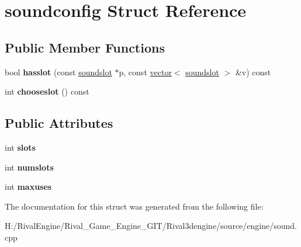 \hypertarget{structsoundconfig}{}\section{soundconfig Struct Reference}
\label{structsoundconfig}
\subsection*{Public Member Functions}
\begin{DoxyCompactItemize}
\item 
\mbox{\label{structsoundconfig_aeb69ffff91904dc36452a62a4b24dab7}} 
bool {\bfseries hasslot} (const \hyperlink{structsoundslot}{soundslot} $\ast$p, const \hyperlink{structvector}{vector}$<$ \hyperlink{structsoundslot}{soundslot} $>$ \&v) const
\item 
\mbox{\label{structsoundconfig_ae851aaf065b2e70436b993bb0e7738d6}} 
int {\bfseries chooseslot} () const
\end{DoxyCompactItemize}
\subsection*{Public Attributes}
\begin{DoxyCompactItemize}
\item 
\mbox{\label{structsoundconfig_a92f135ce709409bc4ca195ed58c67eab}} 
int {\bfseries slots}
\item 
\mbox{\label{structsoundconfig_a38da64a5934dce72b1141146c7f8fa94}} 
int {\bfseries numslots}
\item 
\mbox{\label{structsoundconfig_af846e56999ded1e419f5bd61c7352bf4}} 
int {\bfseries maxuses}
\end{DoxyCompactItemize}


The documentation for this struct was generated from the following file\+:\begin{DoxyCompactItemize}
\item 
H\+:/\+Rival\+Engine/\+Rival\+\_\+\+Game\+\_\+\+Engine\+\_\+\+G\+I\+T/\+Rival3dengine/source/engine/sound.\+cpp\end{DoxyCompactItemize}
